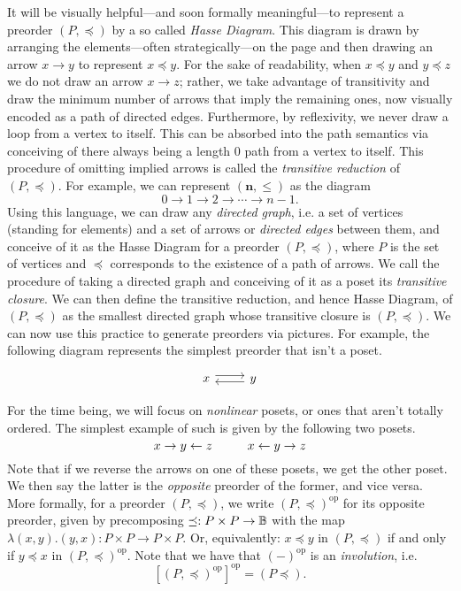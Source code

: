 It will be visually helpful---and soon formally meaningful---to represent a preorder $(P,\preceq)$ by a so called \emph{Hasse Diagram}. This diagram is drawn by arranging the elements---often strategically---on the page and then drawing an arrow $x\to y$ to represent $x\preceq y$. For the sake of readability, when $x\preceq y$ and $y\preceq z$ we do not draw an arrow $x\to z$; rather, we take advantage of transitivity and draw the minimum number of arrows that imply the remaining ones, now visually encoded as a path of directed edges. Furthermore, by reflexivity, we never draw a loop from a vertex to itself. This can be absorbed into the path semantics via conceiving of there always being a length $0$ path from a vertex to itself.  This procedure of omitting implied arrows is called the \emph{transitive reduction} of $(P,\preceq)$. For example, we can represent $(\mathbf{n},\leq)$ as the diagram
\[0\to 1\to 2\to\cdots\to n-1.\]
Using this language, we can draw any \emph{directed graph}, i.e. a set of vertices (standing for elements) and a set of arrows or \emph{directed edges} between them, and conceive of it as the Hasse Diagram for a preorder $(P,\preceq)$, where $P$ is the set of vertices and $\preceq$ corresponds to the existence of a path of arrows. We call the procedure of taking a directed graph and conceiving of it as a poset its \emph{transitive closure}. We can then define the transitive reduction, and hence Hasse Diagram, of $(P,\preceq)$ as the smallest directed graph whose transitive closure is $(P,\preceq)$. We can now use this practice to generate preorders via pictures. For example, the following diagram represents the simplest preorder that isn't a poset.

\[\begin{tikzcd}
x \arrow[r, shift left=.6ex] & y \arrow[l, shift left=.6 ex]
\end{tikzcd}\]

For the time being, we will focus on \emph{nonlinear} posets, or ones that aren't totally ordered. The simplest example of such is given by the following two posets.
\[x\to y\ot z \hspace{10 mm} x\ot y\to z\]
Note that if we reverse the arrows on one of these posets, we get the other poset. We then say the latter is the \emph{opposite} preorder of the former, and vice versa. More formally, for a preorder $(P,\preceq)$, we write $(P,\preceq)^\text{op}$ for its opposite preorder, given by precomposing $\preceq: P\times P\to \mathbb B$ with the map $\lambda(x,y).(y,x):P\times P\to P\times P$. Or, equivalently: $x\preceq y$ in $(P,\preceq)$ if and only if $y\preceq x$ in $(P,\preceq)^\text{op}$. Note that we have that $(-)^\text{op}$ is an \emph{involution}, i.e. \[[(P,\preceq)^\text{op}]^\text{op}=(P\preceq).\]

